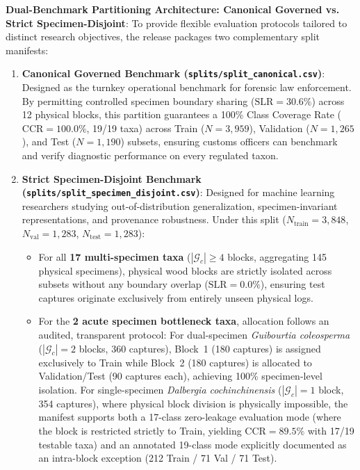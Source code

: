\documentclass[a4paper,fleqn,12pt]{cas-sc}
\begin{document}
\noindent
\textbf{Dual-Benchmark Partitioning Architecture: Canonical Governed vs. Strict Specimen-Disjoint}:
To provide flexible evaluation protocols tailored to distinct research objectives, the release packages two complementary split manifests:
\begin{enumerate}[leftmargin=*,itemsep=2.5pt,topsep=2pt]
    \item \textbf{Canonical Governed Benchmark (\texttt{splits/split\_canonical.csv})}: Designed as the turnkey operational benchmark for forensic law enforcement. By permitting controlled specimen boundary sharing ($\text{SLR} = 30.6\%$) across 12 physical blocks, this partition guarantees a 100\% Class Coverage Rate ($\text{CCR} = 100.0\%$, 19/19 taxa) across Train ($N=3,959$), Validation ($N=1,265$), and Test ($N=1,190$) subsets, ensuring customs officers can benchmark and verify diagnostic performance on every regulated taxon.
    \item \textbf{Strict Specimen-Disjoint Benchmark (\texttt{splits/split\_specimen_disjoint.csv})}: Designed for machine learning researchers studying out-of-distribution generalization, specimen-invariant representations, and provenance robustness. Under this split ($N_{\text{train}} = 3,848$, $N_{\text{val}} = 1,283$, $N_{\text{test}} = 1,283$):
    \begin{itemize}[leftmargin=*,itemsep=1.5pt]
        \item For all \textbf{17 multi-specimen taxa} ($|\mathcal{G}_c| \ge 4$ blocks, aggregating 145 physical specimens), physical wood blocks are strictly isolated across subsets without any boundary overlap ($\text{SLR} = 0.0\%$), ensuring test captures originate exclusively from entirely unseen physical logs.
        \item For the \textbf{2 acute specimen bottleneck taxa}, allocation follows an audited, transparent protocol: For dual-specimen \textit{Guibourtia coleosperma} ($|\mathcal{G}_c| = 2$ blocks, 360 captures), Block~1 (180 captures) is assigned exclusively to Train while Block~2 (180 captures) is allocated to Validation/Test (90 captures each), achieving 100\% specimen-level isolation. For single-specimen \textit{Dalbergia cochinchinensis} ($|\mathcal{G}_c| = 1$ block, 354 captures), where physical block division is physically impossible, the manifest supports both a 17-class zero-leakage evaluation mode (where the block is restricted strictly to Train, yielding $\text{CCR} = 89.5\%$ with 17/19 testable taxa) and an annotated 19-class mode explicitly documented as an intra-block exception (212 Train / 71 Val / 71 Test).
    \end{itemize}
\end{enumerate}
\end{document}
